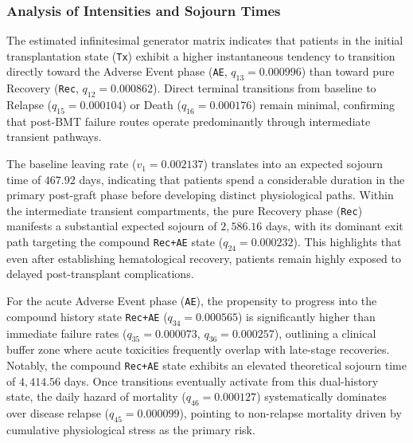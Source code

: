 \documentclass[9pt,a4paper,twocolumn,twoside]{rho-class/rho}
\begin{document}
        \subsubsection{Analysis of Intensities and Sojourn Times}
            The estimated infinitesimal generator matrix indicates that patients in the initial transplantation state (\texttt{Tx}) exhibit a higher instantaneous tendency to transition directly toward the Adverse Event phase (\texttt{AE}, $q_{13}=0.000996$) than toward pure Recovery (\texttt{Rec}, $q_{12}=0.000862$). Direct terminal transitions from baseline to Relapse ($q_{15}=0.000104$) or Death ($q_{16}=0.000176$) remain minimal, confirming that post-BMT failure routes operate predominantly through intermediate transient pathways. 

            The baseline leaving rate ($v_1=0.002137$) translates into an expected sojourn time of $467.92$ days, indicating that patients spend a considerable duration in the primary post-graft phase before developing distinct physiological paths. Within the intermediate transient compartments, the pure Recovery phase (\texttt{Rec}) manifests a substantial expected sojourn of $2,586.16$ days, with its dominant exit path targeting the compound \texttt{Rec+AE} state ($q_{24}=0.000232$). This highlights that even after establishing hematological recovery, patients remain highly exposed to delayed post-transplant complications. 

            For the acute Adverse Event phase (\texttt{AE}), the propensity to progress into the compound history state \texttt{Rec+AE} ($q_{34}=0.000565$) is significantly higher than immediate failure rates ($q_{35}=0.000073$, $q_{36}=0.000257$), outlining a clinical buffer zone where acute toxicities frequently overlap with late-stage recoveries. Notably, the compound \texttt{Rec+AE} state exhibits an elevated theoretical sojourn time of $4,414.56$ days. Once transitions eventually activate from this dual-history state, the daily hazard of mortality ($q_{46}=0.000127$) systematically dominates over disease relapse ($q_{45}=0.000099$), pointing to non-relapse mortality driven by cumulative physiological stress as the primary risk.
\end{document}

